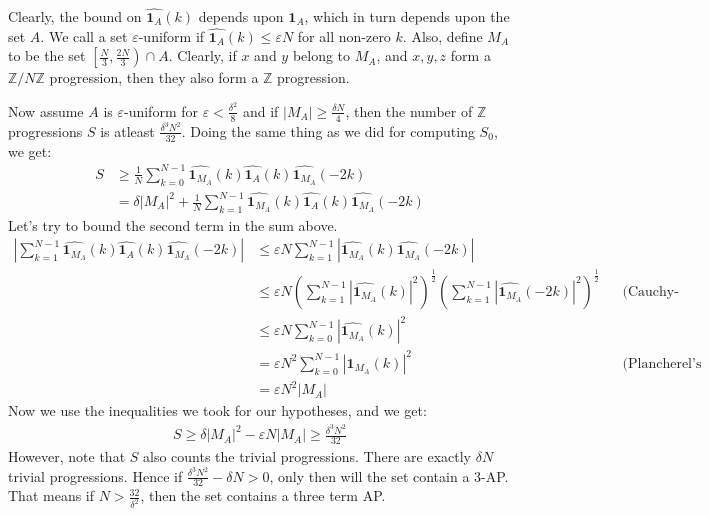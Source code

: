 \documentclass{article}
\newcommand{\integer}{\mathbb{Z}}
\newcommand{\znz}{\mathbb{Z}/N\mathbb{Z}}
\newcommand{\indi}{\mathbf{1}_A}
\newcommand{\indim}{\mathbf{1}_{M_A}}
\newcommand{\vep}{\varepsilon}
\begin{document}
Clearly, the bound on $\widehat{\indi}(k)$ depends upon $\indi$, which in turn depends upon the set $A$. We call a set $\vep$-uniform if $\widehat{\indi}(k) \leq \vep N$ for all non-zero $k$. Also, define $M_A$ to be the set $\left[\frac{N}{3}, \frac{2N}{3}\right) \cap A$. Clearly, if $x$ and $y$ belong to $M_A$, and $x,y,z$ form a $\znz$ progression, then they also form a $\integer$ progression.

Now assume $A$ is $\vep$-uniform for $\vep < \frac{\delta^2}{8}$ and if $|M_A| \geq \frac{\delta N}{4}$, then the number of $\integer$ progressions $S$ is atleast $\frac{\delta^3 N^2}{32}$. Doing the same thing as we did for computing $S_0$, we get:
\begin{align*}
    S &\geq \frac{1}{N} \sum_{k=0}^{N-1} \widehat{\indim}(k)\widehat{\indi}(k)\widehat{\indim}(-2k) \\
    &= \delta |M_A|^2 + \frac{1}{N} \sum_{k=1}^{N-1} \widehat{\indim}(k)\widehat{\indi}(k)\widehat{\indim}(-2k)
\end{align*}
Let's try to bound the second term in the sum above.
\begin{align*}
    \left| \sum_{k=1}^{N-1} \widehat{\indim}(k)\widehat{\indi}(k)\widehat{\indim}(-2k) \right| &\leq \vep N \sum_{k=1}^{N-1} \left|\widehat{\indim}(k)\widehat{\indim}(-2k)\right| \\
    &\leq \vep N \left( \sum_{k=1}^{N-1} \left| \widehat{\indim}(k) \right|^2 \right)^{\frac{1}{2}} \left( \sum_{k=1}^{N-1} \left| \widehat{\indim}(-2k) \right|^2 \right)^{\frac{1}{2}} &&\text{(Cauchy-Schwarz inequality)} \\
    &\leq \vep N \sum_{k=0}^{N-1} \left| \widehat{\indim}(k) \right|^2 \\
    &= \vep N^2 \sum_{k=0}^{N-1} |\indim(k)|^2 &&\text{(Plancherel's equality)} \\
    &= \vep N^2 |M_A|
\end{align*}
Now we use the inequalities we took for our hypotheses, and we get:
\begin{align*}
    S \geq \delta|M_A|^2 - \vep N|M_A| \geq \frac{\delta^3 N^2}{32}
\end{align*}
However, note that $S$ also counts the trivial progressions. There are exactly $\delta N$ trivial progressions. Hence if $\frac{\delta^3 N^2}{32} - \delta N > 0$, only then will the set contain a 3-AP. That means if $N > \frac{32}{\delta^2}$, then the set contains a three term AP.
\end{document}
